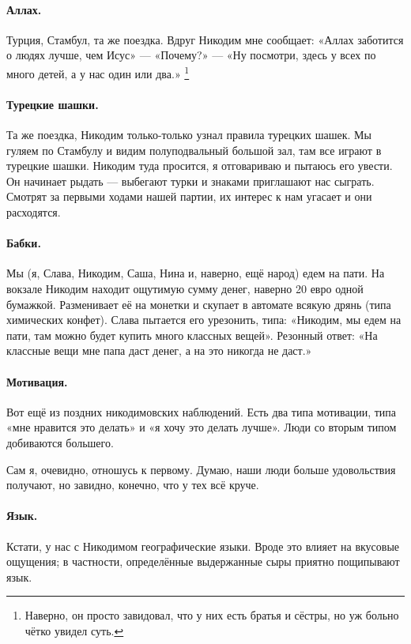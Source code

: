 \documentclass{book}
\begin{document}
\paragraph{Аллах.}
Турция, Стамбул, та же поездка.
Вдруг Никодим мне сообщает: «Аллах заботится о людях лучше, чем Исус» --- «Почему?» --- «Ну посмотри, здесь у всех по много детей, а у нас один или два.»%
\footnote{Наверно, он просто завидовал, что у них есть братья и сёстры, но уж больно чётко увидел суть.} 

\paragraph{Турецкие шашки.}
Та же поездка, Никодим только-только узнал правила турецких шашек.
Мы гуляем по Стамбулу и видим полуподвальный большой зал, там все играют в турецкие шашки.
Никодим туда просится, я отговариваю и пытаюсь его увести.
Он начинает рыдать --- выбегают турки и знаками приглашают нас сыграть.
Смотрят за первыми ходами нашей партии, их интерес к нам угасает и они расходятся.

\paragraph{Бабки.}
Мы (я, Слава, Никодим, Саша, Нина и, наверно, ещё народ) едем на пати.
На вокзале Никодим находит ощутимую сумму денег, наверно 20 евро одной бумажкой.
Разменивает её на монетки и скупает в автомате всякую дрянь (типа химических конфет).
Слава пытается его урезонить, типа: «Никодим, мы едем на пати, там можно будет купить много классных вещей».
Резонный ответ: «На классные вещи мне папа даст денег, а на это никогда не даст.» 

\paragraph{Мотивация.}
Вот ещё из поздних никодимовских наблюдений.
Есть два типа мотивации, типа «мне нравится это делать» и «я хочу это делать лучше».
Люди со вторым типом добиваются большего.

Сам я, очевидно, отношусь к первому.
Думаю, наши люди больше удовольствия получают,
но завидно, конечно, что у тех всё круче.

\paragraph{Язык.}
Кстати, у нас с Никодимом географические языки.
Вроде это влияет на вкусовые ощущения;
в частности, определённые выдержанные сыры приятно пощипывают язык.
\end{document}

